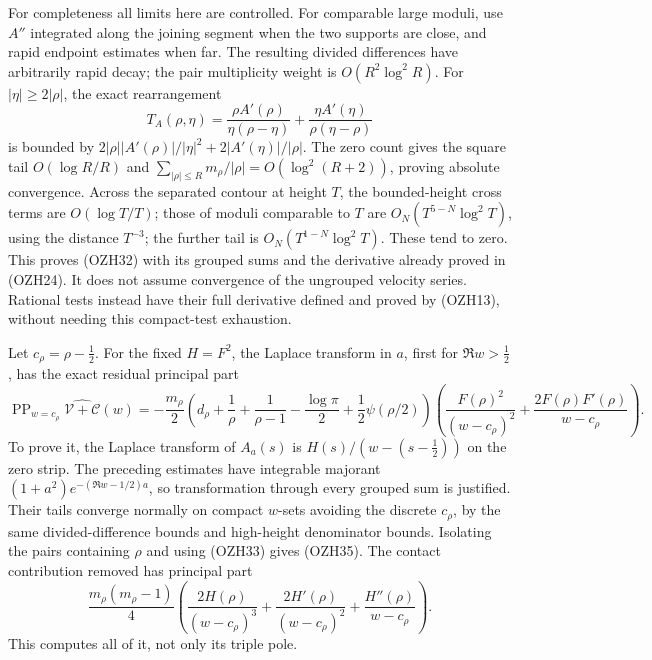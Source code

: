 \documentclass[
  10pt,
  a4paper,
]{article}
\begin{document}
For completeness all limits here are controlled. For comparable large
moduli, use \(A''\) integrated along the joining segment when the two
supports are close, and rapid endpoint estimates when far. The resulting
divided differences have arbitrarily rapid decay; the pair multiplicity
weight is \(O(R^2\log^2R)\). For \(|\eta|\ge2|\rho|\), the exact
rearrangement \[
T_A(\rho,\eta)=
\frac{\rho A'(\rho)}{\eta(\rho-\eta)}
+\frac{\eta A'(\eta)}{\rho(\eta-\rho)}
\tag{OZH34}
\] is bounded by \(2|\rho||A'(\rho)|/|\eta|^2+
2|A'(\eta)|/|\rho|\). The zero count gives the square tail
\(O(\log R/R)\) and \(\sum_{|\rho|\le R}m_\rho/|\rho|=O(\log^2(R+2))\),
proving absolute convergence. Across the separated contour at height
\(T\), the bounded-height cross terms are \(O(\log T/T)\); those of
moduli comparable to \(T\) are \(O_N(T^{5-N}\log^2T)\), using the
distance \(T^{-3}\); the further tail is \(O_N(T^{1-N}\log^2T)\). These
tend to zero. This proves (OZH32) with its grouped sums and the
derivative already proved in (OZH24). It does not assume convergence of
the ungrouped velocity series. Rational tests instead have their full
derivative defined and proved by (OZH13), without needing this
compact-test exhaustion.

Let \(c_\rho=\rho-\frac12\). For the fixed \(H=F^2\), the Laplace
transform in \(a\), first for \(\Re w>\frac12\), has the exact residual
principal part \[
\boxed{
\operatorname{PP}_{w=c_\rho}\widehat{\mathcal V+\mathcal C}(w)
=-\frac{m_\rho}{2}
\left(d_\rho+\frac1\rho+\frac1{\rho-1}
-\frac{\log\pi}{2}+\frac12\psi(\rho/2)\right)
\left(\frac{F(\rho)^2}{(w-c_\rho)^2}
+\frac{2F(\rho)F'(\rho)}{w-c_\rho}\right).}
\tag{OZH35}
\] To prove it, the Laplace transform of \(A_a(s)\) is
\(H(s)/(w-(s-\frac12))\) on the zero strip. The preceding estimates have
integrable majorant \((1+a^2)e^{-(\Re w-1/2)a}\), so transformation
through every grouped sum is justified. Their tails converge normally on
compact \(w\)-sets avoiding the discrete \(c_\rho\), by the same
divided-difference bounds and high-height denominator bounds. Isolating
the pairs containing \(\rho\) and using (OZH33) gives (OZH35). The
contact contribution removed has principal part \[
\frac{m_\rho(m_\rho-1)}4
\left(\frac{2H(\rho)}{(w-c_\rho)^3}
+\frac{2H'(\rho)}{(w-c_\rho)^2}
+\frac{H''(\rho)}{w-c_\rho}\right).
\tag{OZH35a}
\] This computes all of it, not only its triple pole.
\end{document}
